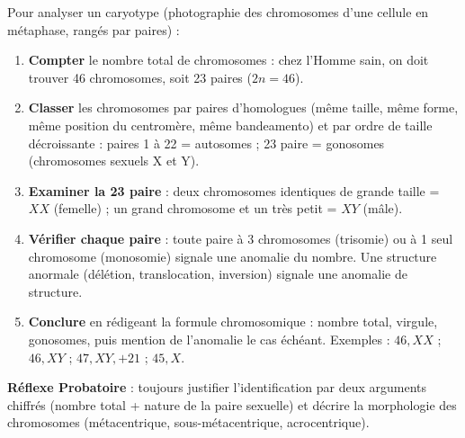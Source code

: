 \documentclass[11pt]{article}
\newcommand{\cle}[1]{{\popxbold\color{popdark}#1}}
\begin{document}
\begin{methode}
Pour analyser un caryotype (photographie des chromosomes d'une cellule en métaphase, rangés par paires) :
\begin{enumerate}
\item \textbf{Compter} le nombre total de chromosomes : chez l'Homme sain, on doit trouver \cle{46 chromosomes}, soit \cle{23 paires} ($2n = 46$).
\item \textbf{Classer} les chromosomes par paires d'\cle{homologues} (même taille, même forme, même position du centromère, même bandeamento) et par ordre de taille décroissante : paires 1 à 22 = \cle{autosomes} ; 23\ieme{} paire = \cle{gonosomes} (chromosomes sexuels X et Y).
\item \textbf{Examiner la 23\ieme{} paire} : deux chromosomes identiques de grande taille = $XX$ (femelle) ; un grand chromosome et un très petit = $XY$ (mâle).
\item \textbf{Vérifier chaque paire} : toute paire à 3 chromosomes (trisomie) ou à 1 seul chromosome (monosomie) signale une anomalie du nombre. Une structure anormale (délétion, translocation, inversion) signale une anomalie de structure.
\item \textbf{Conclure} en rédigeant la \cle{formule chromosomique} : nombre total, virgule, gonosomes, puis mention de l'anomalie le cas échéant. Exemples : $46, XX$ ; $46, XY$ ; $47, XY, +21$ ; $45, X$.
\end{enumerate}
\textbf{Réflexe Probatoire} : toujours justifier l'identification par deux arguments chiffrés (nombre total + nature de la paire sexuelle) et décrire la morphologie des chromosomes (métacentrique, sous-métacentrique, acrocentrique).
\end{methode}
\end{document}
